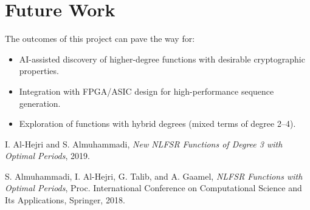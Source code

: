 \documentclass[11pt]{article}
\begin{document}
\section{Future Work}
The outcomes of this project can pave the way for:
\begin{itemize}
    \item AI-assisted discovery of higher-degree functions with desirable cryptographic properties.
    \item Integration with FPGA/ASIC design for high-performance sequence generation.
    \item Exploration of functions with hybrid degrees (mixed terms of degree 2--4).
\end{itemize}


\begin{thebibliography}{9}
I. Al-Hejri and S. Almuhammadi,
\textit{New NLFSR Functions of Degree 3 with Optimal Periods}, 2019.

S. Almuhammadi, I. Al-Hejri, G. Talib, and A. Gaamel,
\textit{NLFSR Functions with Optimal Periods}, Proc. International Conference on Computational Science and Its Applications, Springer, 2018.
\end{thebibliography}
\end{document}
